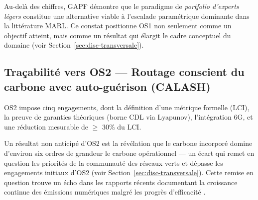Au-delà des chiffres, GAPF démontre que le paradigme de \emph{portfolio d'experts légers} constitue une alternative viable à l'escalade paramétrique dominante dans la littérature MARL. Ce constat positionne OS1 non seulement comme un objectif atteint, mais comme un résultat qui élargit le cadre conceptuel du domaine (voir Section~\ref{sec:disc-transversale}).

\subsection{Traçabilité vers OS2 --- Routage conscient du carbone avec auto-guérison (CALASH)}

OS2 impose cinq engagements, dont la définition d'une métrique formelle (LCI), la preuve de garanties théoriques (borne CDL via Lyapunov), l'intégration 6G, et une réduction mesurable de $\geq$ 30\% du LCI.

\begin{table}[htbp]
\centering
\caption{Traçabilité des résultats CALASH vers les sous-objectifs OS2.}
\label{tab:tracabilite-os2}
\end{table}

Un résultat non anticipé d'OS2 est la révélation que le carbone incorporé domine d'environ six ordres de grandeur le carbone opérationnel --- un écart qui remet en question les priorités de la communauté des réseaux verts et dépasse les engagements initiaux d'OS2 (voir Section~\ref{sec:disc-transversale}). Cette remise en question trouve un écho dans les rapports récents documentant la croissance continue des émissions numériques malgré les progrès d'efficacité \cite{itu_ict2025}.

